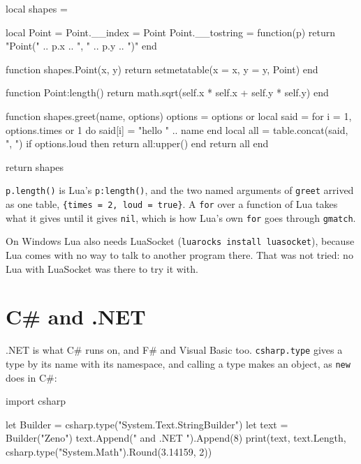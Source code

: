 \begin{zeno}[file=shapes.lua, dir=lua, run=no]
local shapes = {}

local Point = {}
Point.__index = Point
Point.__tostring = function(p) return "Point(" .. p.x .. ", " .. p.y .. ")" end

function shapes.Point(x, y)
    return setmetatable({x = x, y = y}, Point)
end

function Point:length()
    return math.sqrt(self.x * self.x + self.y * self.y)
end

function shapes.greet(name, options)
    options = options or {}
    local said = {}
    for i = 1, options.times or 1 do
        said[i] = "hello " .. name
    end
    local all = table.concat(said, ", ")
    if options.loud then
        return all:upper()
    end
    return all
end

return shapes
\end{zeno}


\verb|p.length()| is Lua's \verb|p:length()|, and the two named
arguments of \verb|greet| arrived as one table,
\verb|{times = 2, loud = true}|. A \verb|for| over a function of Lua takes what it gives until it gives
\verb|nil|, which is how Lua's own \verb|for| goes through
\verb|gmatch|.

\begin{note}
On Windows Lua also needs LuaSocket (\verb|luarocks install luasocket|),
because Lua comes with no way to talk to another program there. That
was not tried: no Lua with LuaSocket was there to try it with.
\end{note}

\section{C\# and .NET}

.NET is what C\# runs on, and F\# and Visual Basic too.
\verb|csharp.type| gives a type by its name with its namespace, and
calling a type makes an object, as \verb|new| does in C\#:

\begin{zeno}[file=builder.zeno, dir=csharp]
import csharp

let Builder = csharp.type("System.Text.StringBuilder")
let text = Builder("Zeno")
text.Append(" and .NET ").Append(8)
print(text, text.Length, csharp.type("System.Math").Round(3.14159, 2))
\end{zeno}

